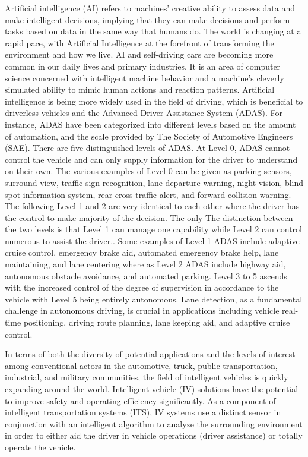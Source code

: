 Artificial intelligence (AI) refers to machines' creative ability to assess data and make intelligent decisions, implying that they can make decisions and perform tasks based on data in the same way that humans do. The world is changing at a rapid pace, with Artificial Intelligence at the forefront of transforming the environment and how we live. AI and self-driving cars are becoming more common in our daily lives and primary industries. It is an area of computer science concerned with intelligent machine behavior and a machine's cleverly simulated ability to mimic human actions and reaction patterns. Artificial intelligence is being more widely used in the field of driving, which is beneficial to driverless vehicles and the Advanced Driver Assistance System (ADAS). For instance, ADAS have been categorized into different levels based on the amount of automation, and the scale provided by The Society of Automotive Engineers (SAE).\cite{8633345} There are five distinguished levels of ADAS. At Level 0, ADAS cannot control the vehicle and can only supply information for the driver to understand on their own. The various examples of Level 0 can be given as parking sensors, surround-view, traffic sign recognition, lane departure warning, night vision, blind spot information system, rear-cross traffic alert, and forward-collision warning. The following Level 1 and 2 are very identical to each other where the driver has the control to make majority of the decision. The only The distinction between the two levels is that Level 1 can manage one capability while Level 2 can control numerous to assist the driver.\cite{8633345}. Some examples of Level 1 ADAS include adaptive cruise control, emergency brake aid, automated emergency brake help, lane maintaining, and lane centering where as Level 2 ADAS include highway aid, autonomous obstacle avoidance, and automated parking. Level 3 to 5 ascends with the increased control of the degree of supervision in accordance to the vehicle with Level 5 being entirely autonomous. Lane detection, as a fundamental challenge in autonomous driving, is crucial in applications including vehicle real-time positioning, driving route planning, lane keeping aid, and adaptive cruise control. 

In terms of both the diversity of potential applications and the levels of interest among conventional actors in the automotive, truck, public transportation, industrial, and military communities, the field of intelligent vehicles is quickly expanding around the world. Intelligent vehicle (IV) solutions have the potential to improve safety and operating efficiency significantly. As a component of intelligent transportation systems (ITS), IV systems use a distinct sensor in conjunction with an intelligent algorithm to analyze the surrounding environment in order to either aid the driver in vehicle operations (driver assistance) or totally operate the vehicle.\cite{1364006}


